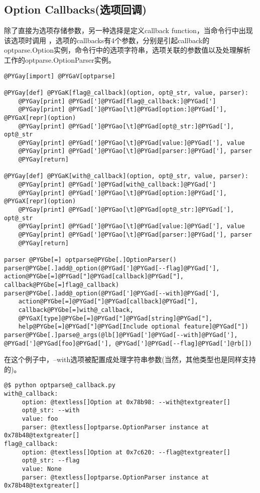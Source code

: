 \documentclass[a4paper,10pt,english]{manual}
\begin{document}
\subsection{Option Callbacks(选项回调)}

除了直接为选项存储参数，另一种选择是定义callback function，当命令行中出现该选项时调用 ，选项的callbacks有4个参数，分别是引起callback的optparse.Option实例，命令行中的选项字符串，选项关联的参数值以及处理解析工作的optparse.OptionParser实例。

\begin{Verbatim}[commandchars=@\[\]]
@PYGay[import] @PYGaV[optparse]

@PYGay[def] @PYGaK[flag@_callback](option, opt@_str, value, parser):
    @PYGay[print] @PYGad[']@PYGad[flag@_callback:]@PYGad[']
    @PYGay[print] @PYGad[']@PYGao[\t]@PYGad[option:]@PYGad['], @PYGaX[repr](option)
    @PYGay[print] @PYGad[']@PYGao[\t]@PYGad[opt@_str:]@PYGad['], opt@_str
    @PYGay[print] @PYGad[']@PYGao[\t]@PYGad[value:]@PYGad['], value
    @PYGay[print] @PYGad[']@PYGao[\t]@PYGad[parser:]@PYGad['], parser
    @PYGay[return]

@PYGay[def] @PYGaK[with@_callback](option, opt@_str, value, parser):
    @PYGay[print] @PYGad[']@PYGad[with@_callback:]@PYGad[']
    @PYGay[print] @PYGad[']@PYGao[\t]@PYGad[option:]@PYGad['], @PYGaX[repr](option)
    @PYGay[print] @PYGad[']@PYGao[\t]@PYGad[opt@_str:]@PYGad['], opt@_str
    @PYGay[print] @PYGad[']@PYGao[\t]@PYGad[value:]@PYGad['], value
    @PYGay[print] @PYGad[']@PYGao[\t]@PYGad[parser:]@PYGad['], parser
    @PYGay[return]

parser @PYGbe[=] optparse@PYGbe[.]OptionParser()
parser@PYGbe[.]add@_option(@PYGad[']@PYGad[--flag]@PYGad['], action@PYGbe[=]@PYGad["]@PYGad[callback]@PYGad["], callback@PYGbe[=]flag@_callback)
parser@PYGbe[.]add@_option(@PYGad[']@PYGad[--with]@PYGad['],
    action@PYGbe[=]@PYGad["]@PYGad[callback]@PYGad["],
    callback@PYGbe[=]with@_callback,
    @PYGaX[type]@PYGbe[=]@PYGad["]@PYGad[string]@PYGad["],
    help@PYGbe[=]@PYGad["]@PYGad[Include optional feature]@PYGad["])
parser@PYGbe[.]parse@_args(@lb[]@PYGad[']@PYGad[--with]@PYGad['], @PYGad[']@PYGad[foo]@PYGad['], @PYGad[']@PYGad[--flag]@PYGad[']@rb[])
\end{Verbatim}

在这个例子中，--with选项被配置成处理字符串参数(当然，其他类型也是同样支持的)。

\begin{Verbatim}[commandchars=@\[\]]
@$ python optparse@_callback.py
with@_callback:
     option: @textless[]Option at 0x78b98: --with@textgreater[]
     opt@_str: --with
     value: foo
     parser: @textless[]optparse.OptionParser instance at 0x78b48@textgreater[]
flag@_callback:
     option: @textless[]Option at 0x7c620: --flag@textgreater[]
     opt@_str: --flag
     value: None
     parser: @textless[]optparse.OptionParser instance at 0x78b48@textgreater[]
\end{Verbatim}
\end{document}
